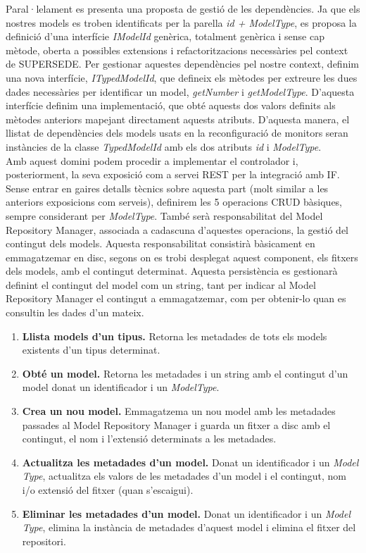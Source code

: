 Paral·lelament es presenta una proposta de gestió de les dependències. Ja que els nostres models es troben identificats per la parella \textit{id + ModelType}, es proposa la definició d'una interfície \textit{IModelId} genèrica, totalment genèrica i sense cap mètode, oberta a possibles extensions i refactoritzacions necessàries pel context de SUPERSEDE. Per gestionar aquestes dependències pel nostre context, definim una nova interfície, \textit{ITypedModelId}, que defineix els mètodes per extreure les dues dades necessàries per identificar un model, \textit{getNumber} i \textit{getModelType}. D'aquesta interfície definim una implementació, que obté aquests dos valors definits als mètodes anteriors mapejant directament aquests atributs. D'aquesta manera, el llistat de dependències dels models usats en la reconfiguració de monitors seran instàncies de la classe \textit{TypedModelId} amb els dos atributs \textit{id} i \textit{ModelType}.\\ 

Amb aquest domini podem procedir a implementar el controlador i, posteriorment, la seva exposició com a servei REST per la integració amb IF. Sense entrar en gaires detalls tècnics sobre aquesta part (molt similar a les anteriors exposicions com serveis), definirem les 5 operacions CRUD bàsiques, sempre considerant per \textit{ModelType}. També serà responsabilitat del Model Repository Manager, associada a cadascuna d'aquestes operacions, la gestió del contingut dels models. Aquesta responsabilitat consistirà bàsicament en emmagatzemar en disc, segons on es trobi desplegat aquest component, els fitxers dels models, amb el contingut determinat. Aquesta persistència es gestionarà definint el contingut del model com un string, tant per indicar al Model Repository Manager el contingut a emmagatzemar, com per obtenir-lo quan es consultin les dades d'un mateix.

\begin{enumerate}
\item \textbf{Llista models d'un tipus.} Retorna les metadades de tots els models existents d'un tipus determinat.
\item \textbf{Obté un model.} Retorna les metadades i un string amb el contingut d'un model donat un identificador i un \textit{ModelType}.
\item \textbf{Crea un nou model.} Emmagatzema un nou model amb les metadades passades al Model Repository Manager i guarda un fitxer a disc amb el contingut, el nom i l'extensió determinats a les metadades.
\item \textbf{Actualitza les metadades d'un model.} Donat un identificador i un \textit{Model Type}, actualitza els valors de les metadades d'un model i el contingut, nom i/o extensió del fitxer (quan s'escaigui). 
\item \textbf{Eliminar les metadades d'un model.} Donat un identificador i un \textit{Model Type}, elimina la instància de metadades d'aquest model i elimina el fitxer del repositori.
\end{enumerate}


